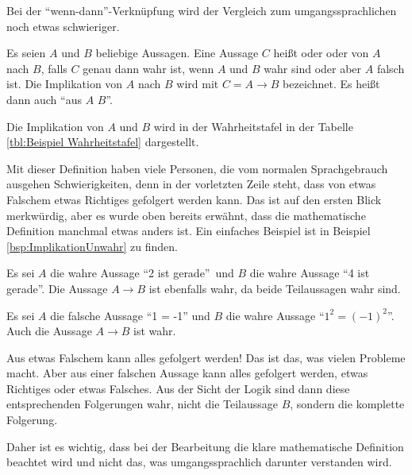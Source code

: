 
\begin{Unit} Bei der \enquote{wenn-dann}-Verknüpfung 
wird der Vergleich zum umgangssprachlichen noch etwas schwieriger.

\begin{Definition}
Es seien $A$ und $B$ beliebige Aussagen. Eine Aussage $C$ heißt
 oder  oder  von 
$A$ nach $B$, falls $C$ genau dann wahr ist, wenn $A$ und $B$ wahr sind oder 
aber $A$ falsch ist. Die Implikation von $A$ nach $B$ wird mit 
$C = A \rightarrow B$ bezeichnet. Es heißt dann auch \enquote{aus $A$
 $B$}.
\end{Definition}

Die Implikation von $A$ und $B$ wird in der Wahrheitstafel in der Tabelle
\ref{tbl:Beispiel Wahrheitstafel} dargestellt.

Mit dieser Definition haben viele Personen, die vom normalen Sprachgebrauch 
ausgehen Schwierigkeiten, denn in der vorletzten Zeile steht, dass von etwas
Falschem etwas Richtiges gefolgert werden kann. Das ist auf den ersten Blick
merkwürdig, aber es wurde oben bereits erwähnt, dass die mathematische 
Definition manchmal etwas anders ist. Ein einfaches Beispiel ist in 
Beispiel \ref{bsp:ImplikationUnwahr} zu finden.
\end{Unit}


\begin{Unit}[Beispiel]
Es sei $A$ die wahre Aussage \enquote{2 ist gerade}\ und $B$ die wahre 
Aussage \enquote{4 ist gerade}. Die Aussage $A \rightarrow B$ ist ebenfalls 
wahr, da beide Teilaussagen wahr sind. 
\end{Unit}

\begin{Unit}[Beispiel]
\label{bsp:ImplikationUnwahr}
Es sei $A$ die falsche Aussage \enquote{1 = -1} und $B$ die wahre Aussage
\enquote{$1^2 = (-1)^2$}. Auch die Aussage $A \rightarrow B$ ist wahr.

Aus etwas Falschem kann alles gefolgert werden! Das ist das, was vielen 
Probleme macht. Aber aus einer falschen Aussage kann alles gefolgert werden, 
etwas Richtiges oder etwas Falsches. Aus der Sicht der Logik sind dann diese
entsprechenden Folgerungen wahr, nicht die Teilaussage $B$, sondern die 
komplette Folgerung.

Daher ist es wichtig, dass bei der Bearbeitung die klare mathematische 
Definition beachtet wird und nicht das, was umgangssprachlich darunter 
verstanden wird.
\end{Unit}

